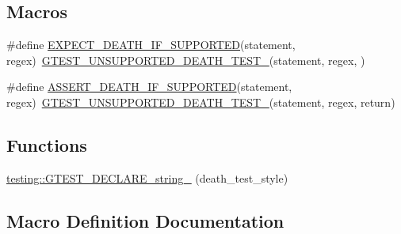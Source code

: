 \subsection*{Macros}
\begin{DoxyCompactItemize}
\item 
\#define \hyperlink{gtest-death-test_8h_a8564de0e012dd0898949c513d1571f8b}{E\+X\+P\+E\+C\+T\+\_\+\+D\+E\+A\+T\+H\+\_\+\+I\+F\+\_\+\+S\+U\+P\+P\+O\+R\+T\+ED}(statement,  regex)~\hyperlink{gtest-death-test-internal_8h_a29a145cda8bd2d0c6a78b0ac1d670d18}{G\+T\+E\+S\+T\+\_\+\+U\+N\+S\+U\+P\+P\+O\+R\+T\+E\+D\+\_\+\+D\+E\+A\+T\+H\+\_\+\+T\+E\+S\+T\+\_\+}(statement, regex, )
\item 
\#define \hyperlink{gtest-death-test_8h_ab2f0f25b46353767179a49ebd15b7345}{A\+S\+S\+E\+R\+T\+\_\+\+D\+E\+A\+T\+H\+\_\+\+I\+F\+\_\+\+S\+U\+P\+P\+O\+R\+T\+ED}(statement,  regex)~\hyperlink{gtest-death-test-internal_8h_a29a145cda8bd2d0c6a78b0ac1d670d18}{G\+T\+E\+S\+T\+\_\+\+U\+N\+S\+U\+P\+P\+O\+R\+T\+E\+D\+\_\+\+D\+E\+A\+T\+H\+\_\+\+T\+E\+S\+T\+\_\+}(statement, regex, return)
\end{DoxyCompactItemize}
\subsection*{Functions}
\begin{DoxyCompactItemize}
\item 
\hyperlink{namespacetesting_a37b7e87f0a5f502c6918f37d1768c1f3}{testing\+::\+G\+T\+E\+S\+T\+\_\+\+D\+E\+C\+L\+A\+R\+E\+\_\+string\+\_\+} (death\+\_\+test\+\_\+style)
\end{DoxyCompactItemize}


\subsection{Macro Definition Documentation}
